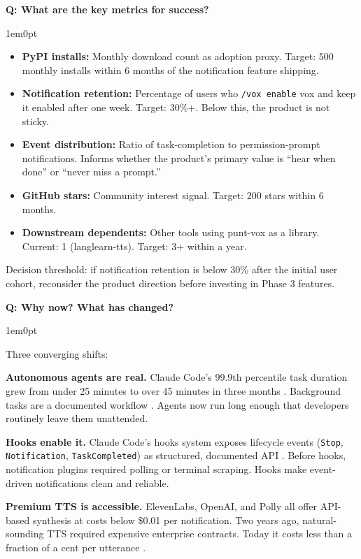 \documentclass[11pt,letterpaper]{article}
\newcounter{faqnum}
\newenvironment{faqpair}[1]{%
  \needspace{4\baselineskip}%
  \vspace{0.5em}%
  \refstepcounter{faqnum}%
  \noindent\textbf{\color{SectionBlue}Q\thefaqnum: #1}\par\nopagebreak[4]%
  \vspace{0.2em}%
  \begin{adjustwidth}{1em}{0pt}%
  \setlength{\parindent}{0pt}%
}{%
  \end{adjustwidth}%
  \vspace{0.5em}%
}
\begin{document}
\begin{faqpair}{What are the key metrics for success?}\label{faq:metrics}
  \begin{itemize}[leftmargin=1.5em, nosep]
    \item \textbf{PyPI installs:} Monthly download count as adoption proxy.
          Target: 500 monthly installs within 6 months of the notification
          feature shipping.
    \item \textbf{Notification retention:} Percentage of users who
          \texttt{/vox enable} vox and keep it enabled after one week. Target:
          30\%+. Below this, the product is not sticky.
    \item \textbf{Event distribution:} Ratio of task-completion to
          permission-prompt notifications. Informs whether the product's
          primary value is ``hear when done'' or ``never miss a prompt.''
    \item \textbf{GitHub stars:} Community interest signal. Target: 200
          stars within 6 months.
    \item \textbf{Downstream dependents:} Other tools using punt-vox as a
          library. Current: 1 (langlearn-tts). Target: 3+ within a year.
  \end{itemize}

  Decision threshold: if notification retention is below 30\% after the
  initial user cohort, reconsider the product direction before investing in
  Phase 3 features.
\end{faqpair}

\begin{faqpair}{Why now? What has changed?}
  Three converging shifts:

  \textbf{Autonomous agents are real.} Claude Code's 99.9th percentile task
  duration grew from under 25 minutes to over 45 minutes in three months
  \cite{anthropic2026agentautonomy}. Background tasks are a documented
  workflow \cite{venturebeat2025claudetasks}. Agents now run long enough that
  developers routinely leave them unattended.

  \textbf{Hooks enable it.} Claude Code's hooks system exposes lifecycle
  events (\texttt{Stop}, \texttt{Notification}, \texttt{TaskCompleted})
  as structured, documented API \cite{claudecodehooks2026}. Before hooks,
  notification plugins required polling or terminal scraping. Hooks make
  event-driven notifications clean and reliable.

  \textbf{Premium TTS is accessible.} ElevenLabs, OpenAI, and Polly all offer
  API-based synthesis at costs below \$0.01 per notification. Two years ago,
  natural-sounding TTS required expensive enterprise contracts. Today it costs
  less than a fraction of a cent per utterance
  \cite{texttolab2025pricing}.
\end{faqpair}
\end{document}
